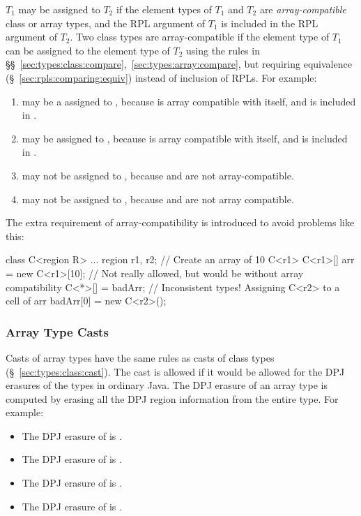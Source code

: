  $T_1$ may be
assigned to $T_2$ if the element types of $T_1$ and $T_2$ are
\emph{array-compatible} class or array types, and the RPL argument of
$T_1$ is included in the RPL argument of $T_2$.  Two class types are
array-compatible if the element type of $T_1$ can be assigned to the
element type of $T_2$ using the rules in
\S\S~\ref{sec:types:class:compare},~\ref{sec:types:array:compare}, but
requiring equivalence (\S~\ref{sec:rpls:comparing:equiv}) instead of
inclusion of RPLs.  For example:
%
\begin{enumerate}
\item {} may be a assigned to , because
   is array compatible with itself, and  is included
  in .
\item {} may be assigned to ,
  because  is array compatible with itself, and 
  is included in .
\item {} may not be assigned to ,
  because  and  are not array-compatible.
\item {} may not be assigned to
  , because  and 
  are not array compatible.
\end{enumerate}
%
The extra requirement of array-compatibility is introduced to avoid
problems like this:
%
\begin{dpjlisting}
class C<region R> { ... }
region r1, r2;
// Create an array of 10 C<r1>
C<r1>[] arr = new C<r1>[10];
// Not really allowed, but would be without array compatibility
C<*>[] = badArr;
// Inconsistent types!  Assigning C<r2> to a cell of arr
badArr[0] = new C<r2>();
\end{dpjlisting}

\subsubsection{Array Type Casts%
\label{sec:types:array:cast}}

Casts of array types have the same rules as casts of class types
(\S~\ref{sec:types:class:cast}).  The cast is allowed if it would be
allowed for the DPJ erasures of the types in ordinary Java.  The DPJ
erasure of an array type is computed by erasing all the DPJ region
information from the entire type.  For example:
%
\begin{itemize}
\item The DPJ erasure of  is .
\item The DPJ erasure of  is .
\item The DPJ erasure of  is
  .
\item The DPJ erasure of  is .
\end{itemize}

